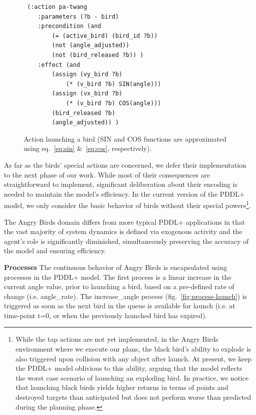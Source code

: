 \begin{figure}
\begin{center}
    \fontsize{8pt}{10pt}\selectfont
\begin{verbatim}
 (:action pa-twang
    :parameters (?b - bird)
    :precondition (and
        (= (active_bird) (bird_id ?b))
        (not (angle_adjusted))
        (not (bird_released ?b)) )
    :effect (and
        (assign (vy_bird ?b) 
            (* (v_bird ?b) SIN(angle)))
        (assign (vx_bird ?b) 
            (* (v_bird ?b) COS(angle)))
        (bird_released ?b)
        (angle_adjusted)) )
\end{verbatim}
\caption{Action launching a bird (SIN and COS functions are approximated using eq.~\ref{eq:sin} \&~\ref{eq:cos}, respectively).}
\label{fig:action-pa-twang}
\end{center}
\end{figure}
\noindent As far as the birds' special actions are concerned, we defer their implementation to the next phase of our work. While most of their consequences are straightforward to implement, significant deliberation about their encoding is needed to maintain the model's efficiency. In the current version of the PDDL+ model, we only consider the basic behavior of birds without their special powers\footnote{While the tap actions are not yet implemented, in the Angry Birds environment where we execute our plans, the black bird's ability to explode is also triggered upon collision with any object after launch. At present, we keep the PDDL+ model oblivious to this ability, arguing that the model reflects the worst case scenario of launching an exploding bird. In practice, we notice that launching black birds yields higher returns in terms of points and destroyed targets than anticipated but does not perform worse than predicted during the planning phase.}. 

 The Angry Birds domain differs from more typical PDDL+ applications in that the vast majority of system dynamics is defined via exogenous activity and the agent's role is significantly diminished, simultaneously preserving the accuracy of the model and ensuring efficiency. 

\noindent\textbf{Processes}
The continuous behavior of Angry Birds is encapsulated using processes in the PDDL+ model. The first process is a linear increase in the current angle value, prior to launching a bird, based on a pre-defined rate of change (i.e. angle\_rate). The increase\_angle process (fig.~\ref{fig:process-launch}) is triggered as soon as the next bird in the queue is available for launch (i.e. at time-point t=0, or when the previously launched bird has expired). 


